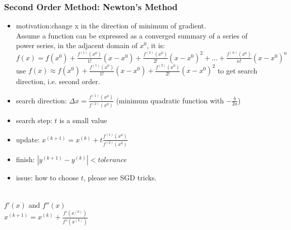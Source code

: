 \begin{frame}
\frametitle{Second Order Method: Newton's Method}
	\small
	\begin{itemize}
		\item motivation:change x in the direction of minimum of gradient.\\
		\hspace{1cm}Assume a function can be expressed as a converged summary of a series of power series, in the adjacent domain of $x^0$, it is: \\
		 $f(x)=f(x^0)+\frac {f^{(1)}(x^0)}{1!}(x-x^0)+\frac {f^{(2)}(x^0)}{2!}(x-x^0)^2+...+\frac {f^{(n)}(x^0)}{n!}(x-x^0)^n$\\
		use $f(x) \approx f(x^0)+\frac {f^{(1)}(x^0)}{1!}(x-x^0)+\frac {f^{(2)}(x^0)}{2!}(x-x^0)^2$ to get search direction, i.e. second order.
		\item search direction: $\Delta x=\frac {f^{(1)}(x^0)}{f^{(2)}(x^0)}$ (minimum quadratic function with $-\frac{b}{2a}$)
		\item search step: $t$ is a small value
		\item update: $x^{(k+1)}=x^{(k)}+t\frac {f^{(1)}(x^0)}{f^{(2)}(x^0)}$
		\item finish: $|y^{(k+1)}-y^{(k)}| < tolerance$
		\item issue: how to choose $t$, please see SGD tricks. 
	\end{itemize}
\end{frame}
\begin{frame}[c]
	\centering 
	\\$f'(x)$ and $f''(x)$
	\\$x^{(k+1)}=x^{(k)}+\frac{f'(x^{(k)})}{f''(x^{(k)})}$
\end{frame}
\ifx\allfiles\undefined

\fi
